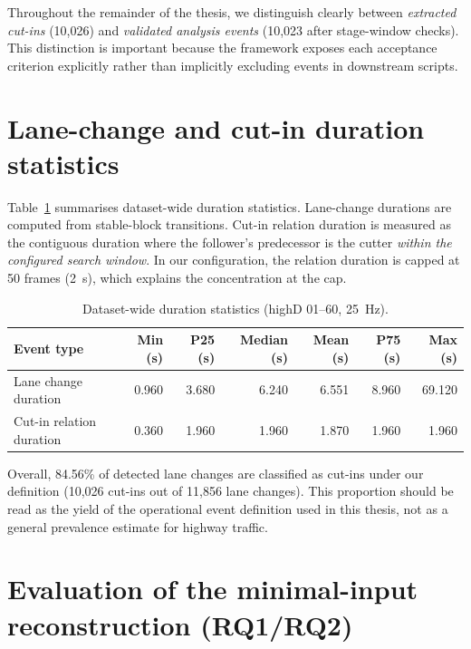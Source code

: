 \documentclass[12pt,a4paper,twoside,openright]{report}
\begin{document}
    Throughout the remainder of the thesis, we distinguish clearly between \emph{extracted cut-ins} (10,026) and \emph{validated analysis events} (10,023 after stage-window checks). This distinction is important because the framework exposes each acceptance criterion explicitly rather than implicitly excluding events in downstream scripts.

    \section{Lane-change and cut-in duration statistics}
    Table~\ref{tab:duration-stats} summarises dataset-wide duration statistics. Lane-change durations are computed from stable-block transitions. Cut-in relation duration is measured as the contiguous duration where the follower's predecessor is the cutter \emph{within the configured search window}. In our configuration, the relation duration is capped at 50 frames (\SI{2}{\second}), which explains the concentration at the cap.

    \begin{table}[H]
        \centering
        \caption{Dataset-wide duration statistics (highD 01--60, \SI{25}{\hertz}).}
        \label{tab:duration-stats}
        {\small
        \setlength{\tabcolsep}{4pt}
            \begin{tabular}{@{}lrrrrrr@{}}
                \toprule
                Event type & Min (s) & P25 (s) & Median (s) & Mean (s) & P75 (s) & Max (s) \\
                \midrule
                Lane change duration & 0.960 & 3.680 & 6.240 & 6.551 & 8.960 & 69.120 \\
                Cut-in relation duration & 0.360 & 1.960 & 1.960 & 1.870 & 1.960 & 1.960 \\
                \bottomrule
            \end{tabular}}
    \end{table}

    Overall, 84.56\% of detected lane changes are classified as cut-ins under our definition (10,026 cut-ins out of 11,856 lane changes). This proportion should be read as the yield of the operational event definition used in this thesis, not as a general prevalence estimate for highway traffic.

    \section{Evaluation of the minimal-input reconstruction (RQ1/RQ2)}
\end{document}
